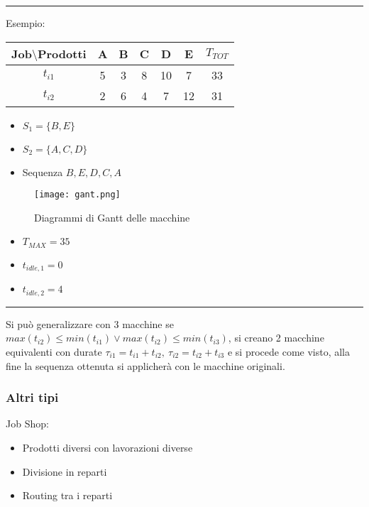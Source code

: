 \documentclass{article}
\begin{document}
\noindent\rule{\textwidth}{0.5pt}

\noindent Esempio:\newline


\begin{table}[ht]
    \centering
    \begin{tabular}{c|c|c|c|c|c|c}
        Job$\setminus$Prodotti & A & B & C & D & E & $T_{TOT}$\\
        \hline
        $t_{i1}$ & 5 & 3 & 8 & 10 & 7 & 33\\
        \hline
        $t_{i2}$ & 2 & 6 & 4 & 7 & 12 & 31\\
    \end{tabular}
\end{table}

\begin{itemize}
    \item $S_1=\{B,E\}$
    \item $S_2=\{A,C,D\}$
    \item Sequenza $B,E,D,C,A$\newline
\end{itemize}

\begin{figure}[ht]
    \centering
    \texttt{[image: gant.png]}
    \caption{Diagrammi di Gantt delle macchine}
\end{figure}

\begin{itemize}
    \item $T_{MAX}=35$
    \item $t_{idle,1}=0$
    \item $t_{idle,2}=4$
\end{itemize}

\noindent\rule{\textwidth}{0.5pt}

\newpage

\noindent Si può generalizzare con 3 macchine se $max(t_{i2})\leq min(t_{i1})\vee max(t_{i2})\leq min(t_{i3})$, si creano 2 macchine equivalenti con durate $\tau_{i1}=t_{i1}+t_{i2},\ \tau_{i2}=t_{i2}+t_{i3}$ e si procede come visto, alla fine la sequenza ottenuta si applicherà con le macchine originali.\newline

\subsubsection{Altri tipi}

Job Shop:
\begin{itemize}
    \item Prodotti diversi con lavorazioni diverse
    \item Divisione in reparti
    \item Routing tra i reparti\newline
\end{itemize}
\end{document}

